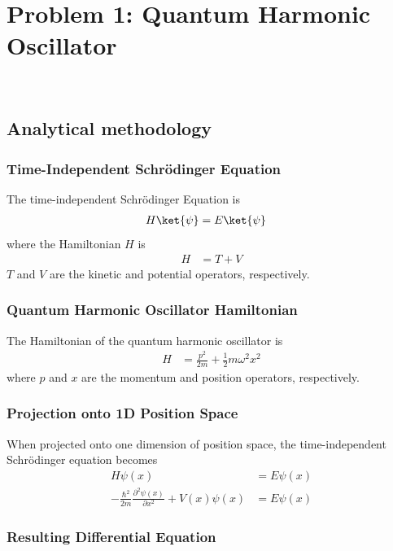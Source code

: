 \section{Problem 1: Quantum Harmonic Oscillator}

\

\subsection{Analytical methodology}

\subsubsection{Time-Independent Schrödinger Equation}

The time-independent Schrödinger Equation is
\begin{align*}
    H\ket{\psi} &= E \ket{\psi} 
\end{align*}
%
where the Hamiltonian $H$ is
\begin{align*}
    H &= T + V
\end{align*}
%
$T$ and $V$ are the kinetic and potential operators, respectively.

\subsubsection{Quantum Harmonic Oscillator Hamiltonian}

The Hamiltonian of the quantum harmonic oscillator is
\begin{align*}
    H &= \frac{p^2}{2m} + \frac{1}{2} m \omega^2 x^2
\end{align*}
%
where $p$ and $x$ are the momentum and position operators, respectively.

\subsubsection{Projection onto 1D Position Space}

When projected onto one dimension of position space, the time-independent Schrödinger equation becomes
\begin{align*}
    H\psi(x) &= E \psi(x) \\
    -\frac{\hbar^2}{2m}\frac{\partial^2 \psi(x)}{\partial x^2} + V(x)\psi(x) &= E \psi(x)
\end{align*}

\subsubsection{Resulting Differential Equation}

